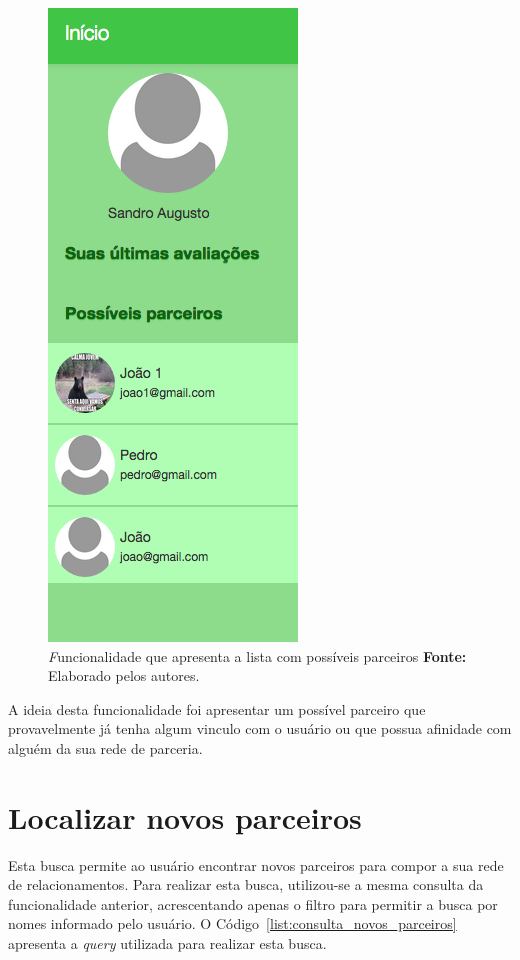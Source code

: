\begin{figure}[h!]
	\centerline{\includegraphics[scale=0.4]{./imagens/busca-possiveis-parceiros.png}}
	\caption[\textit Funcionalidade que apresenta a lista com possíveis parceiros]
	{\textit Funcionalidade que apresenta a lista com possíveis parceiros \textbf{Fonte:} Elaborado pelos autores.}
	\label{fig:busca_possiveis_parceiros}
\end{figure}

\par A ideia desta funcionalidade foi apresentar um possível parceiro que provavelmente já tenha algum vinculo com o usuário ou que possua afinidade com alguém da sua rede de parceria.

\section{Localizar novos parceiros}
\par Esta busca permite ao usuário encontrar novos parceiros para compor a sua rede de relacionamentos. Para realizar esta busca, utilizou-se a mesma consulta da funcionalidade anterior, acrescentando apenas o filtro para permitir a busca por nomes informado pelo usuário. O Código~\ref{list:consulta_novos_parceiros} apresenta a \textit{query} utilizada para realizar esta busca.

